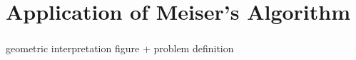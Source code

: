 \section{Application of Meiser's Algorithm}
\begin{frame}\frametitle{\insertsection}\justifying
geometric interpretation figure + problem definition
\end{frame}
